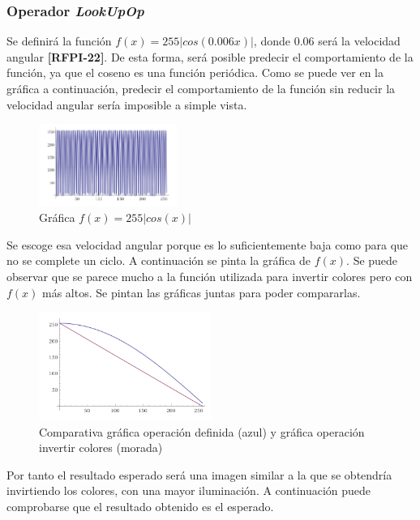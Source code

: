 \subsubsection{Operador \textit{LookUpOp}}
Se definirá la función $f(x) = 255|cos(0.006x)|$, donde $0.06$ será la velocidad angular \textbf{[RFPI-22]}. De esta forma, será posible predecir el comportamiento de la función, ya que el coseno es una función periódica. Como se puede ver en la gráfica a continuación, predecir el comportamiento de la función sin reducir la velocidad angular sería imposible a simple vista.
\vskip0.3cm
\begin{figure}[H]
 \centering
  \includegraphics[width=0.4\textwidth]{imagenes/graficaCoseno2.png}
 \caption{Gráfica $f(x) = 255|cos(x)|$}
 \label{diseño}
 \end{figure}
Se escoge esa velocidad angular porque es lo suficientemente baja como para que no se complete un ciclo. A continuación se pinta la gráfica de $f(x)$. Se puede observar que se parece mucho a la función utilizada para invertir colores pero con $f(x)$ más altos. Se pintan las gráficas juntas para poder compararlas.
\vskip0.3cm
\begin{figure}[H]
 \centering
  \includegraphics[width=0.5\textwidth]{imagenes/graficasjuntas.png}  
 \caption{Comparativa gráfica operación definida (azul) y gráfica operación invertir colores (morada)}
 \label{diseño}
 \end{figure}
 Por tanto el resultado esperado será una imagen similar a la que se obtendría invirtiendo los colores, con una mayor iluminación. A continuación puede comprobarse que el resultado obtenido es el esperado.
 \vskip0.3cm
